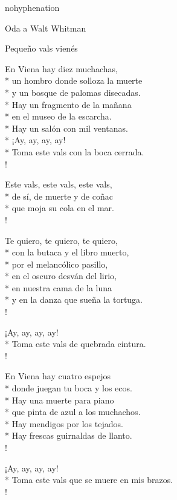 \documentclass[
    a5paper,
    DIV=10,
    12pt,
    notitlepage,
    oneside,]
{scrbook} %
\begin{document}
\begin{hyphenrules}{nohyphenation}
\begin{poem}{Oda a Walt Whitman}{}{\vspace{-1em}}
\end{poem}


\begin{poem}{Pequeño vals vienés}{}{\vspace{-1em}}

En Viena hay diez muchachas,\\*
un hombro donde solloza la muerte\\*
y un bosque de palomas disecadas.\\*
Hay un fragmento de la mañana\\*
en el museo de la escarcha.\\*
Hay un salón con mil ventanas.\\*
¡Ay, ay, ay, ay!\\*
Toma este vals con la boca cerrada.\\!

Este vals, este vals, este vals,\\*
de sí, de muerte y de coñac\\*
que moja su cola en el mar.\\!

Te quiero, te quiero, te quiero,\\*
con la butaca y el libro muerto,\\*
por el melancólico pasillo,\\*
en el oscuro desván del lirio,\\*
en nuestra cama de la luna\\*
y en la danza que sueña la tortuga.\\!

¡Ay, ay, ay, ay!\\*
Toma este vals de quebrada cintura.\\!

En Viena hay cuatro espejos\\*
donde juegan tu boca y los ecos.\\*
Hay una muerte para piano\\*
que pinta de azul a los muchachos.\\*
Hay mendigos por los tejados.\\*
Hay frescas guirnaldas de llanto.\\!

¡Ay, ay, ay, ay!\\*
Toma este vals que se muere en mis brazos.\\!


\end{poem}
\end{hyphenrules}
\end{document}
